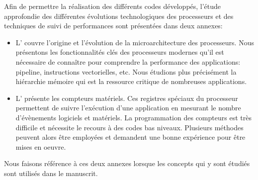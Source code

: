         Afin de permettre la réalisation des différents codes développés, l'étude approfondie des différentes évolutions technologiques des processeurs et des techniques de suivi de performances sont présentées dans deux annexes:
        \begin{itemize}
            \item L' couvre l'origine et l'évolution de la microarchitecture des processeurs. Nous présentons les fonctionnalités clés des processeurs modernes qu'il est nécessaire de connaître pour comprendre la performance des applications: pipeline, instructions vectorielles, etc. Nous étudions plus précisément la hiérarchie mémoire qui est la ressource critique de nombreuses applications. 
            
            \item L' présente les compteurs matériels. Ces registres spéciaux du processeur permettent de suivre l'exécution d'une application en mesurant le nombre d'évènements logiciels et matériels. La programmation des compteurs est très difficile et nécessite le recours à des codes bas niveaux. Plusieurs méthodes peuvent alors être employées et demandent une bonne expérience pour être mises en oeuvre.
        \end{itemize}
       Nous faisons référence à ces deux annexes lorsque les concepts qui y sont étudiés sont utilisés dans le manuscrit.